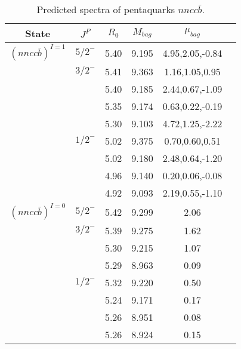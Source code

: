 \documentclass[prd,twocolumn,floatfix,nofootinbib]{revtex4}
\begin{document}
\begin{table*}[!htbp]
    \caption{Predicted spectra of pentaquarks $nncc\bar{b}$.}
    \begin{tabular}{cccccc}
        \hline\hline
        {\rm State} &$J^{P}$ &$R_{0}$ &$M_{bag}$ &$\mu_{bag}$  \\ \hline
        ${(nncc\bar{b})}^{I=1}$
            &${5/2}^{-}$     &5.40   &9.195 &4.95,2.05,-0.84  \\                
            &${3/2}^{-}$     &5.41   &9.363 &1.16,1.05,0.95 \\
                         &$ $     &5.40   &9.185 &2.44,0.67,-1.09  \\
                         &$ $     &5.35   &9.174 &0.63,0.22,-0.19  \\
                         &$ $     &5.30   &9.103 &4.72,1.25,-2.22 \\
            &${1/2}^{-}$     &5.02   &9.375 &0.70,0.60,0.51  \\
                         &$ $     &5.02   &9.180 &2.48,0.64,-1.20  \\
                         &$ $     &4.96   &9.140 &0.20,0.06,-0.08  \\
                         &$ $     &4.92   &9.093 &2.19,0.55,-1.10 \\
            ${(nncc\bar{b})}^{I=0}$
            &${5/2}^{-}$     &5.42   &9.299 &2.06  \\                
            &${3/2}^{-}$     &5.39   &9.275 &1.62 \\
                         &$ $     &5.30   &9.215 &1.07  \\
                         &$ $     &5.29   &8.963 &0.09  \\
            &${1/2}^{-}$     &5.32   &9.220 &0.50  \\
                         &$ $     &5.24   &9.171 &0.17  \\
                         &$ $     &5.26   &8.951 &0.08  \\
                         &$ $     &5.26   &8.924 &0.15 \\
       \hline\hline
    \end{tabular}
\end{table*}
\end{document}
